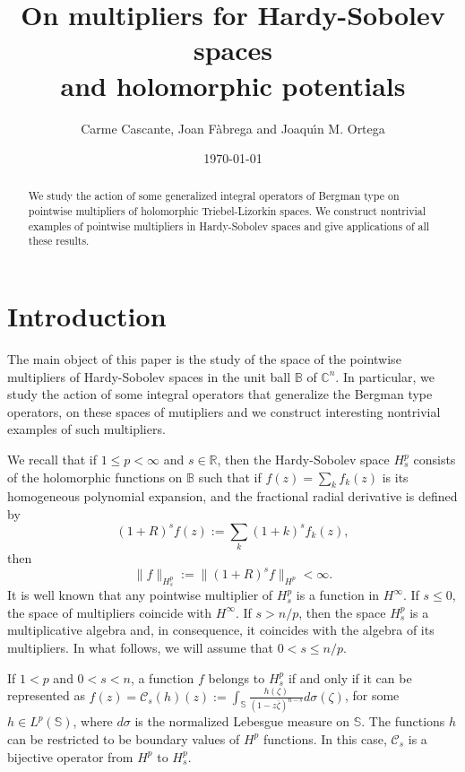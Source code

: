 \documentclass[12pt,twoside,leqno,final]{amsart}
\title[On multipliers for Hardy-Sobolev spaces]{On multipliers for Hardy-Sobolev spaces  \\and holomorphic potentials}
\author{Carme Cascante, Joan F\`abrega and Joaqu\'\i n M. Ortega}
\date{\today}
\theoremstyle{plain}
\begin{document}
\begin{abstract} 
We study the action of some generalized integral operators of Bergman type on pointwise multipliers of holomorphic Triebel-Lizorkin spaces. 
We  construct  nontrivial examples of pointwise multipliers in Hardy-Sobolev spaces and give applications of all these results.
\end{abstract}

\maketitle

\section{Introduction}\label{sec:intro} 
The main object of this paper is the study of the space of the pointwise multipliers of Hardy-Sobolev spaces in the unit ball ${{\mathbb B}}$ of ${{\mathbb C}}^n$. In particular, we study the action of some integral operators that generalize the Bergman type operators, on
these spaces of mutipliers and we construct interesting nontrivial examples of such multipliers.

We recall that 
if $1\le p<\infty$ and $s\in {{\mathbb R}}$, then 
the Hardy-Sobolev space $H^p_s$ consists of the holomorphic functions on ${{\mathbb B}}$ such that 
 if ${\displaystyle f(z)=\sum_k f_k(z)}$ is its homogeneous polynomial expansion, and   the fractional radial derivative is defined by $$ {\displaystyle (1+R)^s f(z):=\sum_k (1+k)^s f_k(z)}, $$ 
 then
$$
\|f\|_{H^p_s}:=\|(1+R)^{s}f\|_{H^p}<\infty.
$$ 
It is well known that any pointwise multiplier of $H_s^p$ is a function in $H^\infty$. If $s\leq 0$, the space of multipliers coincide with $H^\infty$. If $s>n/p$, then the space $H_s^p$ is a multiplicative algebra and, in consequence, it coincides with the algebra of its multipliers. In what follows, we will assume that $0<s\leq n/p$.

If $1<p$ and $0<s<n$, a function $f$ belongs to $H_s^p$ if and only if it can be represented as $\displaystyle{f(z)={\mathcal C}_s(h)(z):= \int_{{\mathbb S}} \frac{h(\zeta)}{(1-z\overline{\zeta})^{n-s}}}d\sigma(\zeta)
$, 
for some $h\in L^p({{\mathbb S}})$, where $d\sigma$ is the normalized Lebesgue measure on ${{\mathbb S}}$. 
The functions $h$ can be restricted to be boundary values of $H^p$ functions. In this case, ${\mathcal C}_s$ is a bijective operator from $H^p$ to $H_s^p$.
\end{document}
